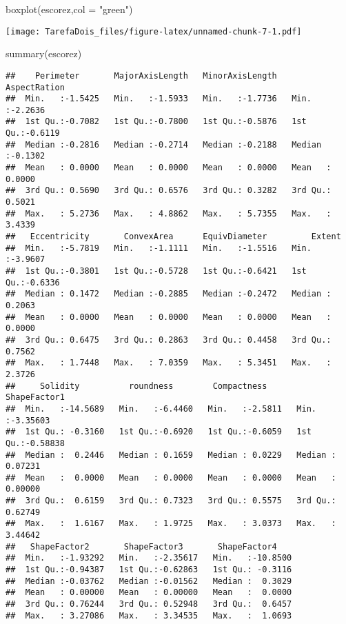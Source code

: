 \documentclass[
]{article}
\newenvironment{Shaded}{\begin{snugshade}}{\end{snugshade}}
\newcommand{\AttributeTok}[1]{\textcolor[rgb]{0.77,0.63,0.00}{#1}}
\newcommand{\FunctionTok}[1]{\textcolor[rgb]{0.00,0.00,0.00}{#1}}
\newcommand{\NormalTok}[1]{#1}
\newcommand{\StringTok}[1]{\textcolor[rgb]{0.31,0.60,0.02}{#1}}
\begin{document}
\begin{Shaded}
\begin{Highlighting}[]
\FunctionTok{boxplot}\NormalTok{(escorez,}\AttributeTok{col =} \StringTok{"green"}\NormalTok{)}
\end{Highlighting}
\end{Shaded}

\texttt{[image: TarefaDois\_files/figure-latex/unnamed-chunk-7-1.pdf]}

\begin{Shaded}
\begin{Highlighting}[]
\FunctionTok{summary}\NormalTok{(escorez)}
\end{Highlighting}
\end{Shaded}

\begin{verbatim}
##    Perimeter       MajorAxisLength   MinorAxisLength    AspectRation    
##  Min.   :-1.5425   Min.   :-1.5933   Min.   :-1.7736   Min.   :-2.2636  
##  1st Qu.:-0.7082   1st Qu.:-0.7800   1st Qu.:-0.5876   1st Qu.:-0.6119  
##  Median :-0.2816   Median :-0.2714   Median :-0.2188   Median :-0.1302  
##  Mean   : 0.0000   Mean   : 0.0000   Mean   : 0.0000   Mean   : 0.0000  
##  3rd Qu.: 0.5690   3rd Qu.: 0.6576   3rd Qu.: 0.3282   3rd Qu.: 0.5021  
##  Max.   : 5.2736   Max.   : 4.8862   Max.   : 5.7355   Max.   : 3.4339  
##   Eccentricity       ConvexArea      EquivDiameter         Extent       
##  Min.   :-5.7819   Min.   :-1.1111   Min.   :-1.5516   Min.   :-3.9607  
##  1st Qu.:-0.3801   1st Qu.:-0.5728   1st Qu.:-0.6421   1st Qu.:-0.6336  
##  Median : 0.1472   Median :-0.2885   Median :-0.2472   Median : 0.2063  
##  Mean   : 0.0000   Mean   : 0.0000   Mean   : 0.0000   Mean   : 0.0000  
##  3rd Qu.: 0.6475   3rd Qu.: 0.2863   3rd Qu.: 0.4458   3rd Qu.: 0.7562  
##  Max.   : 1.7448   Max.   : 7.0359   Max.   : 5.3451   Max.   : 2.3726  
##     Solidity          roundness        Compactness       ShapeFactor1     
##  Min.   :-14.5689   Min.   :-6.4460   Min.   :-2.5811   Min.   :-3.35603  
##  1st Qu.: -0.3160   1st Qu.:-0.6920   1st Qu.:-0.6059   1st Qu.:-0.58838  
##  Median :  0.2446   Median : 0.1659   Median : 0.0229   Median : 0.07231  
##  Mean   :  0.0000   Mean   : 0.0000   Mean   : 0.0000   Mean   : 0.00000  
##  3rd Qu.:  0.6159   3rd Qu.: 0.7323   3rd Qu.: 0.5575   3rd Qu.: 0.62749  
##  Max.   :  1.6167   Max.   : 1.9725   Max.   : 3.0373   Max.   : 3.44642  
##   ShapeFactor2       ShapeFactor3       ShapeFactor4     
##  Min.   :-1.93292   Min.   :-2.35617   Min.   :-10.8500  
##  1st Qu.:-0.94387   1st Qu.:-0.62863   1st Qu.: -0.3116  
##  Median :-0.03762   Median :-0.01562   Median :  0.3029  
##  Mean   : 0.00000   Mean   : 0.00000   Mean   :  0.0000  
##  3rd Qu.: 0.76244   3rd Qu.: 0.52948   3rd Qu.:  0.6457  
##  Max.   : 3.27086   Max.   : 3.34535   Max.   :  1.0693
\end{verbatim}
\end{document}
